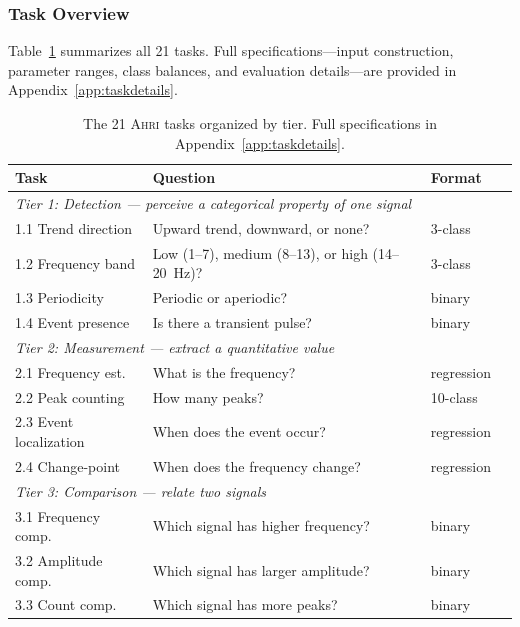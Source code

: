\documentclass[11pt]{article}
\newcommand{\ahri}{\textsc{Ahri}}
\begin{document}
\subsubsection{Task Overview}

Table~\ref{tab:tasksummary} summarizes all 21 tasks. Full specifications---input construction, parameter ranges, class balances, and evaluation details---are provided in Appendix~\ref{app:taskdetails}.

\begin{table}[t]
\centering
\small
\caption{The 21 \ahri{} tasks organized by tier. Full specifications in Appendix~\ref{app:taskdetails}.}
\label{tab:tasksummary}
\begin{tabular}{llll}
\toprule
\textbf{Task} & \textbf{Question} & \textbf{Format} \\
\midrule
\multicolumn{3}{l}{\emph{Tier 1: Detection --- perceive a categorical property of one signal}} \\
1.1 Trend direction    & Upward trend, downward, or none?           & 3-class \\
1.2 Frequency band     & Low (1--7), medium (8--13), or high (14--20~Hz)?   & 3-class \\
1.3 Periodicity        & Periodic or aperiodic?                     & binary \\
1.4 Event presence     & Is there a transient pulse?                & binary \\
\midrule
\multicolumn{3}{l}{\emph{Tier 2: Measurement --- extract a quantitative value}} \\
2.1 Frequency est.     & What is the frequency?                    & regression \\
2.2 Peak counting      & How many peaks?                            & 10-class \\
2.3 Event localization & When does the event occur?                 & regression \\
2.4 Change-point       & When does the frequency change?            & regression \\
\midrule
\multicolumn{3}{l}{\emph{Tier 3: Comparison --- relate two signals}} \\
3.1 Frequency comp.    & Which signal has higher frequency?          & binary \\
3.2 Amplitude comp.    & Which signal has larger amplitude?          & binary \\
3.3 Count comp.        & Which signal has more peaks?                & binary \\

\end{tabular}
\end{table}
\end{document}
